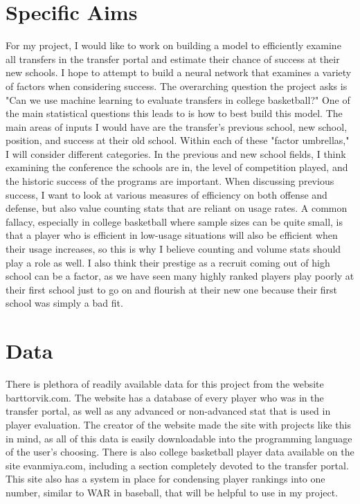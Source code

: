 \documentclass[12pt]{article}
\begin{document}
\section{Specific Aims}
\label{sec:aims}
For my project, I would like to work on building a model to efficiently examine all transfers in the transfer portal and estimate their chance of success at their new schools. I hope to attempt to build a neural network that examines a variety of factors when considering success. The overarching question the project asks is "Can we use machine learning to evaluate transfers in college basketball?" One of the main statistical questions this leads to is how to best build this model. The main areas of inputs I would have are the transfer's previous school, new school, position, and success at their old school. Within each of these "factor umbrellas," I will consider different categories. In the previous and new school fields, I think examining the conference the schools are in, the level of competition played, and the historic success of the programs are important. When discussing previous success, I want to look at various measures of efficiency on both offense and defense, but also value counting stats that are reliant on usage rates. A common fallacy, especially in college basketball where sample sizes can be quite small, is that a player who is efficient in low-usage situations will also be efficient when their usage increases, so this is why I believe counting and volume stats should play a role as well. I also think their prestige as a recruit coming out of high school can be a factor, as we have seen many highly ranked players play poorly at their first school just to go on and flourish at their new one because their first school was simply a bad fit. 

\section{Data}
\label{sec:data}
There is plethora of readily available data for this project from the website barttorvik.com. The website has a database of every player who was in the transfer portal, as well as any advanced or non-advanced stat that is used in player evaluation. The creator of the website made the site with projects like this in mind, as all of this data is easily downloadable into the programming language of the user's choosing. There is also college basketball player data available on the site evanmiya.com, including a section completely devoted to the transfer portal. This site also has a system in place for condensing player rankings into one number, similar to WAR in baseball, that will be helpful to use in my project. 
\end{document}
